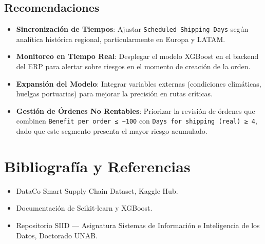 \documentclass[
  letterpaper,
  DIV=11,
  numbers=noendperiod]{scrartcl}
\providecommand{\tightlist}{%
  \setlength{\itemsep}{0pt}\setlength{\parskip}{0pt}}
\begin{document}
\subsection{Recomendaciones}\label{recomendaciones}

\begin{itemize}
\tightlist
\item
  \textbf{Sincronización de Tiempos}: Ajustar
  \texttt{Scheduled\ Shipping\ Days} según analítica histórica regional,
  particularmente en Europa y LATAM.
\item
  \textbf{Monitoreo en Tiempo Real}: Desplegar el modelo XGBoost en el
  backend del ERP para alertar sobre riesgos en el momento de creación
  de la orden.
\item
  \textbf{Expansión del Modelo}: Integrar variables externas
  (condiciones climáticas, huelgas portuarias) para mejorar la precisión
  en rutas críticas.
\item
  \textbf{Gestión de Órdenes No Rentables}: Priorizar la revisión de
  órdenes que combinen \texttt{Benefit\ per\ order\ ≤\ −100} con
  \texttt{Days\ for\ shipping\ (real)\ ≥\ 4}, dado que este segmento
  presenta el mayor riesgo acumulado.
\end{itemize}

\section{Bibliografía y
Referencias}\label{bibliografuxeda-y-referencias}

\begin{itemize}
\tightlist
\item
  DataCo Smart Supply Chain Dataset, Kaggle Hub.
\item
  Documentación de Scikit-learn y XGBoost.
\item
  Repositorio SIID --- Asignatura Sistemas de Información e Inteligencia
  de los Datos, Doctorado UNAB.
\end{itemize}
\end{document}
